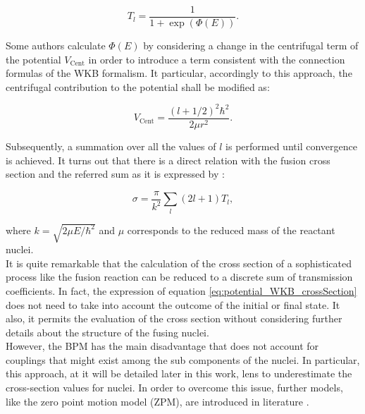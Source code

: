 \documentclass[openany]{book}
\begin{document}
\begin{equation} \label{eq:potential_WKB_transmission}
	T_l =  \frac{1}{1 + \exp ({\Phi(E)} )}.
\end{equation}

Some authors calculate $\Phi(E)$ by considering a change in the centrifugal term of the potential $V_{\mathrm{Cent}}$ in order to introduce a term consistent with the connection formulas of the WKB formalism. It particular, accordingly to this approach, the centrifugal contribution to the potential shall be modified as: 

\begin{equation} \label{eq:potential_WKB_modified_centrifugal}
	V_{\mathrm{Cent}} = \frac{(l + 1/2)^2 \hbar^2}{2\mu r^2}.
\end{equation}

Subsequently, a summation over all the values of $l$ is performed until convergence is achieved. It turns out that there is a direct relation with the fusion cross section and the referred sum as it is expressed by \cite{koyuncu_soylu_2018, nobre_chamon_gasques_carlson_thompson_2007}:

\begin{equation} \label{eq:potential_WKB_crossSection}
	\sigma = \frac{\pi}{k^2} \sum_{l}{(2l + 1)T_l},  
\end{equation}

where $k = \sqrt{2\mu E / \hbar^2}$ and $\mu$ corresponds to the reduced mass of the reactant nuclei.  \\

It is quite remarkable that the calculation of the cross section of a sophisticated process like the fusion reaction can be reduced to a discrete sum of transmission coefficients. In fact, the expression of equation \ref{eq:potential_WKB_crossSection} does not need to take into account the outcome of the initial or final state. It also, it permits the evaluation of the cross section without considering further details about the structure of the fusing nuclei.  \\

However, the BPM has the main disadvantage that does not account for couplings that might exist among the sub components of the nuclei. In particular, this approach, at it will be detailed later in this work, lens to underestimate the cross-section values for nuclei. In order to overcome this issue, further models, like the zero point motion model (ZPM), are introduced in literature \cite{duarte_gasques_oliveira_zagatto_chamon_medina_added_seale_alcantara-nunez_rossi_et_2015, nobre_chamon_gasques_carlson_thompson_2007}.   \\  
\end{document}
